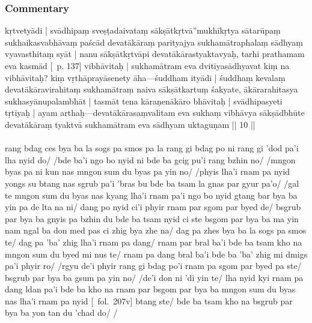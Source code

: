 \documentclass[12pt]{article}
\newcommand{\emdash} {\hspace{0em}—\hspace{0em}}
\begin{document}
\subsubsection{Commentary}
kṛtvetyādi | svādhipaṃ sveṣṭadaivataṃ sākṣātkṛtvā''mukhīkṛtya sātarūpaṃ sukhaikasvabhāvaṃ paścād devatākāraṃ parityajya sukhamātraphalaṃ sādhyaṃ vyavasthitaṃ syāt | nanu sākṣātkṛtvāpi devatākārastyaktavyaḥ, tarhi prathamam eva kasmād [\EDD\ p. 137] vibhāvitaḥ | sukhamātram eva dvitīyasādhyavat kiṃ na vibhāvitaḥ? kiṃ vṛthāprayāsenety āha\emdash śuddham ityādi | śuddhaṃ kevalaṃ devatākāravirahitaṃ sukhamātraṃ naiva sākṣātkartuṃ śakyate, ākārarahitasya sukhasyānupalambhāt | tasmāt tena kāraṇenākāro bhāvitaḥ | svādhipasyeti tṛtīyaḥ | ayam arthaḥ\emdash devatākārasaṃvalitam eva sukhaṃ vibhāvya sākṣādbhūte devatākāraṃ tyaktvā sukhamātram eva sādhyam uktaguṇam || 10 ||\\

\textbf{\TVA}\\
rang bdag ces bya ba la sogs pa smos pa la rang gi bdag po ni rang gi 'dod pa'i lha nyid do/ /bde ba'i ngo bo nyid ni bde ba gcig pu'i rang bzhin no/ /mngon byas pa ni kun nas mngon sum du byas pa yin no/ /phyis lha'i rnam pa nyid yongs su btang nas sgrub pa'i 'bras bu bde ba tsam la gnas par gyur pa'o/ /gal te mngon sum du byas nas kyang lha'i rnam pa'i ngo bo nyid gtang bar bya ba yin pa de lta na ni/ dang po nyid ci'i phyir rnam par sgom par byed de/ bsgrub par bya ba gnyis pa bzhin du bde ba tsam nyid ci ste bsgom par bya ba ma yin nam ngal ba don med pas ci zhig bya zhe na/ dag pa zhes bya ba la sogs pa smos te/ dag pa 'ba' zhig lha'i rnam pa dang/ rnam par bral ba'i bde ba tsam kho na mngon sum du byed mi nus te/ rnam pa dang bral ba'i bde ba 'ba' zhig mi dmigs pa'i phyir ro/ /rgyu de'i phyir rang gi bdag po'i rnam pa sgom par byed pa ste/ bsgrub par bya ba gsum pa yin no/ /de'i don ni 'di yin te/ lha nyid kyi rnam pa dang ldan pa'i bde ba kho na rnam par bsgom par bya ba mngon sum du byas nas lha'i rnam pa nyid [\TVA\ fol.\ 207v] btang ste/ bde ba tsam kho na bsgrub par bya ba yon tan du 'chad do/ /\\
\end{document}
